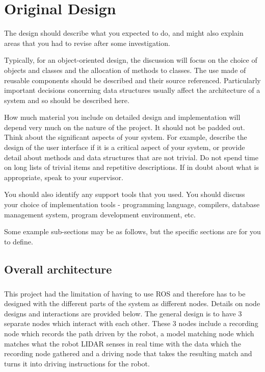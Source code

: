 \chapter{Original Design}

The design should describe what you expected to do, and might also explain areas that you had to revise after some investigation.

Typically, for an object-oriented design, the discussion will focus on the choice of objects and classes and the allocation of methods to classes. The use made of reusable components should be described and their source referenced. Particularly important decisions concerning data structures usually affect the architecture of a system and so should be described here.

How much material you include on detailed design and implementation will depend very much on the nature of the project. It should not be padded out. Think about the significant aspects of your system. For example, describe the design of the user interface if it is a critical aspect of your system, or provide detail about methods and data structures that are not trivial. Do not spend time on long lists of trivial items and repetitive descriptions. If in doubt about what is appropriate, speak to your supervisor.

You should also identify any support tools that you used. You should discuss your choice of implementation tools - programming language, compilers, database management system, program development environment, etc.

Some example sub-sections may be as follows, but the specific sections are for you to define.

\section{Overall architecture}
\paragraph{}
This project had the limitation of having to use ROS\cite{ROS} and therefore has to be designed with the different parts of the system as different nodes. Details on node designs and interactions are provided below. The general design is to have 3 separate nodes which interact with each other. These 3 nodes include a recording node which records the path driven by the robot, a model matching node which matches what the robot LIDAR senses in real time with the data which the recording node gathered and a driving node that takes the resulting match and turns it into driving instructions for the robot.
